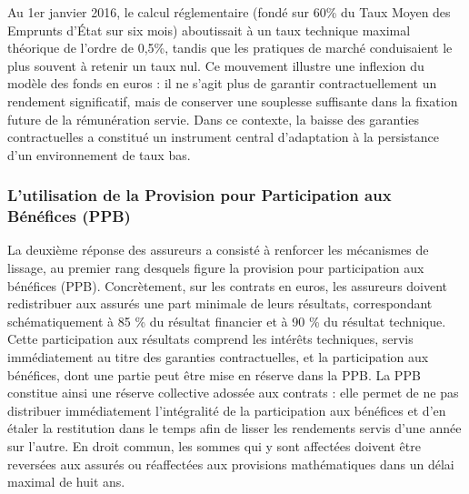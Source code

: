 \begin{center}
\end{center}

Au 1er janvier 2016, le calcul réglementaire (fondé sur 60\% du Taux Moyen des Emprunts d'État sur six mois) aboutissait à un taux technique maximal théorique de l'ordre de 0,5\%, tandis que les pratiques de marché conduisaient le plus souvent à retenir un taux nul. Ce mouvement illustre une inflexion du modèle des fonds en euros : il ne s'agit plus de garantir contractuellement un rendement significatif, mais de conserver une souplesse suffisante dans la fixation future de la rémunération servie. Dans ce contexte, la baisse des garanties contractuelles a constitué un instrument central d'adaptation à la persistance d'un environnement de taux bas.

\subsubsection{L'utilisation de la Provision pour Participation aux Bénéfices (PPB)}

La deuxième réponse des assureurs a consisté à renforcer les mécanismes de lissage, au premier rang desquels figure la provision pour participation aux bénéfices (PPB). Concrètement, sur les contrats en euros, les assureurs doivent redistribuer aux assurés une part minimale de leurs résultats, correspondant schématiquement à 85 \% du résultat financier et à 90 \% du résultat technique. Cette participation aux résultats comprend les intérêts techniques, servis immédiatement au titre des garanties contractuelles, et la participation aux bénéfices, dont une partie peut être mise en réserve dans la PPB. La PPB constitue ainsi une réserve collective adossée aux contrats : elle permet de ne pas distribuer immédiatement l'intégralité de la participation aux bénéfices et d'en étaler la restitution dans le temps afin de lisser les rendements servis d'une année sur l'autre. En droit commun, les sommes qui y sont affectées doivent être reversées aux assurés ou réaffectées aux provisions mathématiques dans un délai maximal de huit ans.

